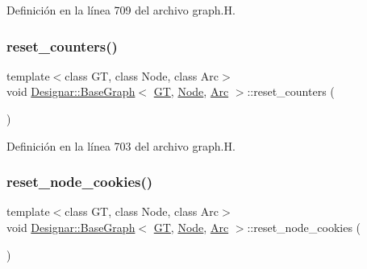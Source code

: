 Definición en la línea 709 del archivo graph.\+H.

\mbox{\label{class_designar_1_1_base_graph_a881c342d8f25d43f995ccfdf876622e1}} 
\subsubsection{\texorpdfstring{reset\+\_\+counters()}{reset\_counters()}}
{\footnotesize\ttfamily template$<$class GT, class Node, class Arc$>$ \\
void \hyperlink{class_designar_1_1_base_graph}{Designar\+::\+Base\+Graph}$<$ \hyperlink{demo-buildgraph_8_c_a3001c40d2c31ca87ed96cd7d1334a55e}{GT}, \hyperlink{namespace_designar_a5af326c65aa2bd26b26c410f2030d09e}{Node}, \hyperlink{namespace_designar_a3f55fb5513d62ff47cbc8f72b8e95d6f}{Arc} $>$\+::reset\+\_\+counters (\begin{DoxyParamCaption}{ }\end{DoxyParamCaption})\hspace{0.3cm}{\ttfamily [inline]}}



Definición en la línea 703 del archivo graph.\+H.

\mbox{\label{class_designar_1_1_base_graph_ab797f80e7efa5a6d0b33f925d6079c18}} 
\subsubsection{\texorpdfstring{reset\+\_\+node\+\_\+cookies()}{reset\_node\_cookies()}}
{\footnotesize\ttfamily template$<$class GT, class Node, class Arc$>$ \\
void \hyperlink{class_designar_1_1_base_graph}{Designar\+::\+Base\+Graph}$<$ \hyperlink{demo-buildgraph_8_c_a3001c40d2c31ca87ed96cd7d1334a55e}{GT}, \hyperlink{namespace_designar_a5af326c65aa2bd26b26c410f2030d09e}{Node}, \hyperlink{namespace_designar_a3f55fb5513d62ff47cbc8f72b8e95d6f}{Arc} $>$\+::reset\+\_\+node\+\_\+cookies (\begin{DoxyParamCaption}{ }\end{DoxyParamCaption})\hspace{0.3cm}{\ttfamily [inline]}}



